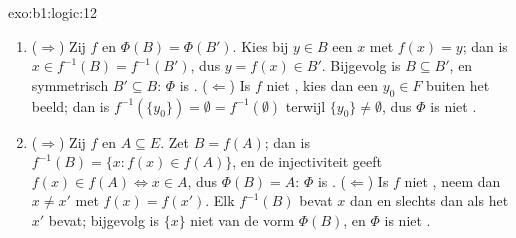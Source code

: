 \begin{solution}{exo:b1:logic:12}
\begin{enumerate}
  \item ($\Rightarrow$) Zij $f$  en $\Phi(B) = \Phi(B')$.
        Kies bij $y \in B$ een $x$ met $f(x) = y$; dan is $x \in
        f^{-1}(B) = f^{-1}(B')$, dus $y = f(x) \in B'$. Bijgevolg is $B
        \subseteq B'$, en symmetrisch $B' \subseteq B$: $\Phi$ is
        . ($\Leftarrow$) Is $f$ niet , kies dan een
        $y_0 \in F$ buiten het beeld; dan is $f^{-1}(\{y_0\}) =
        \emptyset = f^{-1}(\emptyset)$ terwijl $\{y_0\} \neq \emptyset$,
        dus $\Phi$ is niet .
  \item ($\Rightarrow$) Zij $f$  en $A \subseteq E$. Zet $B =
        f(A)$; dan is $f^{-1}(B) = \{x : f(x) \in f(A)\}$, en de
        injectiviteit geeft $f(x) \in f(A) \iff x \in A$, dus $\Phi(B) =
        A$: $\Phi$ is . ($\Leftarrow$) Is $f$ niet ,
        neem dan $x \neq x'$ met $f(x) = f(x')$. Elk 
        $f^{-1}(B)$ bevat $x$ dan en slechts dan als het $x'$ bevat;
        bijgevolg is $\{x\}$ niet van de vorm $\Phi(B)$, en $\Phi$ is
        niet .
\end{enumerate}
\end{solution}

